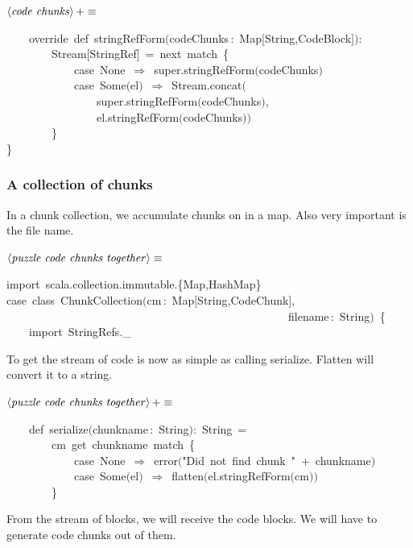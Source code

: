\documentclass[a4paper,12pt]{article}
\begin{document}
$\left<\mbox{\emph{code chunks}}\right>+\equiv$
\begin{program}~~~~{\vem override}~{\vem def}~stringRefForm$($codeChunks\,{\rm :}~Map$[$String,CodeBlock$]$$)${\rm :}
\\~~~~~~~~Stream$[$StringRef$]$~=~next~{\vem match}~{\small\{}
\\~~~~~~~~~~~~{\vem case}~None~$\Rightarrow$~{\vem super}.stringRefForm$($codeChunks$)$
\\~~~~~~~~~~~~{\vem case}~Some$($el$)$~$\Rightarrow$~Stream.concat$($
\\~~~~~~~~~~~~~~~~{\vem super}.stringRefForm$($codeChunks$)$,
\\~~~~~~~~~~~~~~~~el.stringRefForm$($codeChunks$)$$)$
\\~~~~~~~~{\small\}}
\\{\small\}}
\\[0.5em]\end{program}
\subsubsection{A collection of chunks}
In a chunk collection, we accumulate chunks on in a map. Also
very important is the file name.

$\left<\mbox{\emph{puzzle code chunks together}}\right>\equiv$
\begin{program}{\vem import}~scala.collection.immutable.{\small\{}Map,HashMap{\small\}}
\\{\vem case}~{\vem class}~ChunkCollection$($cm\,{\rm :}~Map$[$String,CodeChunk$]$,
\\~~~~~~~~~~~~~~~~~~~~~~~~~~~~~~~~~~~~~~~~~~~~~~~~~~filename\,{\rm :}~String$)$~{\small\{}
\\[0.5em]~~~~{\vem import}~StringRefs.\_
\\[0.5em]\end{program}
To get the stream of code is now as simple as calling
serialize. Flatten will convert it to a string.

$\left<\mbox{\emph{puzzle code chunks together}}\right>+\equiv$
\begin{program}~~~~{\vem def}~serialize$($chunkname\,{\rm :}~String$)${\rm :}~String~=
\\~~~~~~~~cm~get~chunkname~{\vem match}~{\small\{}
\\~~~~~~~~~~~~{\vem case}~None~$\Rightarrow$~error$($"Did~not~find~chunk~"~$+$~chunkname$)$
\\~~~~~~~~~~~~{\vem case}~Some$($el$)$~$\Rightarrow$~flatten$($el.stringRefForm$($cm$)$$)$
\\~~~~~~~~{\small\}}
\\[0.5em]\end{program}
From the stream of blocks, we will receive the code blocks. We
will have to generate code chunks out of them.
\end{document}
